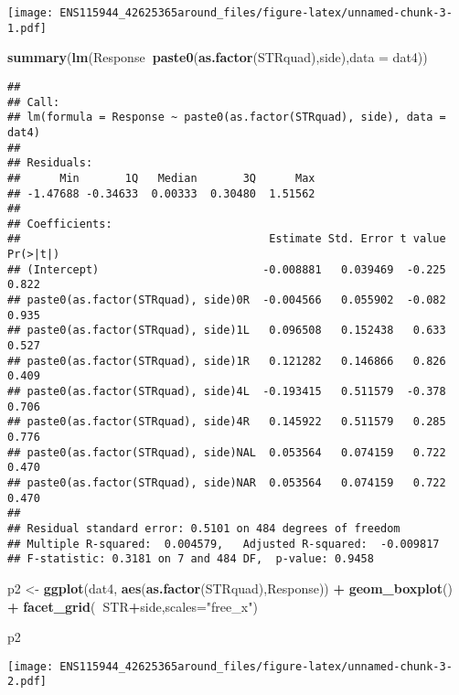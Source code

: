 \documentclass[
]{article}
\newenvironment{Shaded}{\begin{snugshade}}{\end{snugshade}}
\newcommand{\DataTypeTok}[1]{\textcolor[rgb]{0.13,0.29,0.53}{#1}}
\newcommand{\KeywordTok}[1]{\textcolor[rgb]{0.13,0.29,0.53}{\textbf{#1}}}
\newcommand{\NormalTok}[1]{#1}
\newcommand{\OperatorTok}[1]{\textcolor[rgb]{0.81,0.36,0.00}{\textbf{#1}}}
\newcommand{\StringTok}[1]{\textcolor[rgb]{0.31,0.60,0.02}{#1}}
\begin{document}
\texttt{[image: ENS115944\_42625365around\_files/figure-latex/unnamed-chunk-3-1.pdf]}

\begin{Shaded}
\begin{Highlighting}[]
\KeywordTok{summary}\NormalTok{(}\KeywordTok{lm}\NormalTok{(Response}\OperatorTok{~}\KeywordTok{paste0}\NormalTok{(}\KeywordTok{as.factor}\NormalTok{(STRquad),side),}\DataTypeTok{data =}\NormalTok{ dat4))}
\end{Highlighting}
\end{Shaded}

\begin{verbatim}
## 
## Call:
## lm(formula = Response ~ paste0(as.factor(STRquad), side), data = dat4)
## 
## Residuals:
##      Min       1Q   Median       3Q      Max 
## -1.47688 -0.34633  0.00333  0.30480  1.51562 
## 
## Coefficients:
##                                      Estimate Std. Error t value Pr(>|t|)
## (Intercept)                         -0.008881   0.039469  -0.225    0.822
## paste0(as.factor(STRquad), side)0R  -0.004566   0.055902  -0.082    0.935
## paste0(as.factor(STRquad), side)1L   0.096508   0.152438   0.633    0.527
## paste0(as.factor(STRquad), side)1R   0.121282   0.146866   0.826    0.409
## paste0(as.factor(STRquad), side)4L  -0.193415   0.511579  -0.378    0.706
## paste0(as.factor(STRquad), side)4R   0.145922   0.511579   0.285    0.776
## paste0(as.factor(STRquad), side)NAL  0.053564   0.074159   0.722    0.470
## paste0(as.factor(STRquad), side)NAR  0.053564   0.074159   0.722    0.470
## 
## Residual standard error: 0.5101 on 484 degrees of freedom
## Multiple R-squared:  0.004579,   Adjusted R-squared:  -0.009817 
## F-statistic: 0.3181 on 7 and 484 DF,  p-value: 0.9458
\end{verbatim}

\begin{Shaded}
\begin{Highlighting}[]
\NormalTok{p2 <-}\StringTok{ }\KeywordTok{ggplot}\NormalTok{(dat4, }\KeywordTok{aes}\NormalTok{(}\KeywordTok{as.factor}\NormalTok{(STRquad),Response)) }\OperatorTok{+}\StringTok{ }\KeywordTok{geom_boxplot}\NormalTok{() }\OperatorTok{+}\StringTok{ }\KeywordTok{facet_grid}\NormalTok{(}\OperatorTok{~}\NormalTok{STR}\OperatorTok{+}\NormalTok{side,}\DataTypeTok{scales=}\StringTok{"free_x"}\NormalTok{)}

\NormalTok{p2}
\end{Highlighting}
\end{Shaded}

\texttt{[image: ENS115944\_42625365around\_files/figure-latex/unnamed-chunk-3-2.pdf]}
\end{document}
